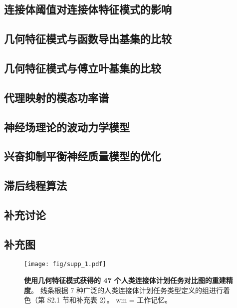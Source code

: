 \documentclass[lang=cn,a4paper,newtx]{elegantpaper}
\begin{document}
\subsection{连接体阈值对连接体特征模式的影响}


\subsection{几何特征模式与函数导出基集的比较} \label{sec:comparison_eigenmodes_derived}


\subsection{几何特征模式与傅立叶基集的比较} \label{sec:comparison_fourier}


\subsection{代理映射的模态功率谱} \label{sec:modal_power_spectra}

\subsection{神经场理论的波动力学模型} \label{sec:NFT_wave}


\subsection{兴奋抑制平衡神经质量模型的优化} \label{sec:mass_optimization}


\subsection{滞后线程算法} \label{sec:lag_threads}


\subsection{补充讨论} \label{sec:supplementary_discussion}






\subsection{补充图}

\begin{figure}[!htb] 
	\centering
	\texttt{[image: fig/supp\_1.pdf]}
	\caption{\textbf{使用几何特征模式获得的 47 个人类连接体计划任务对比图的重建精度}。
		线条根据 7 种广泛的人类连接体计划任务类型定义的组进行着色（第 S2.1 节和补充表 2）。 wm = 工作记忆。} \label{fig:supp_1}
\end{figure}
\end{document}
